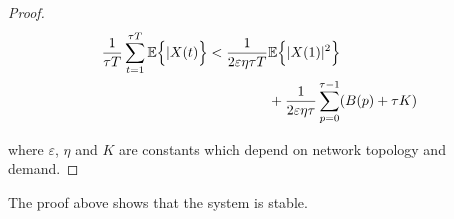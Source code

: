 \begin{proof}
\begin{align} \label{CYCLE_BOUNDS}
\dfrac{1}{\tau T} \displaystyle\sum_{t=1}^{\tau T} \expectation{\vert X(t)}< \dfrac{1}{2\varepsilon\eta\tau T}& \expectation{\vert X(1) \vert^{2}} \\ \nonumber
& + \dfrac{1}{2\varepsilon\eta\tau}\displaystyle\sum_{p=0}^{\tau - 1} (B(p) + \tau K)
\end{align}

where $\varepsilon$, $\eta$ and $K$ are constants which depend on network topology and demand.

\end{proof}

The proof above shows that the system is stable.


%
%
%
%




